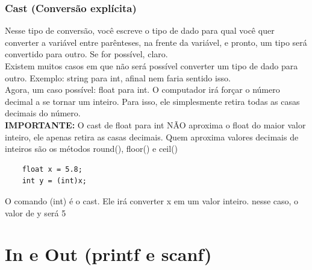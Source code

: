 \documentclass{article}
\begin{document}
\subsubsection{Cast (Conversão explícita)}
Nesse tipo de conversão, você escreve o tipo de dado para qual você quer converter a variável entre parênteses, na frente da variável, e pronto, um tipo será convertido para outro. Se for possível, claro.
\\[3pt]
Existem muitos casos em que não será possível converter um tipo de dado para outro. Exemplo: string para int, afinal nem faria sentido isso.
\\[3pt]
Agora, um caso possível: float para int. O computador irá forçar o número decimal a se tornar um inteiro. Para isso, ele simplesmente retira todas as casas decimais do número. 
\\[3pt]
\textbf{IMPORTANTE:} O cast de float para int NÃO aproxima o float do maior valor inteiro, ele apenas retira as casas decimais. Quem aproxima valores decimais de inteiros são os métodos round(), floor() e ceil() 
\begin{lstlisting}
    float x = 5.8;
    int y = (int)x;
\end{lstlisting}
O comando (int) é o cast. Ele irá converter x em um valor inteiro. nesse caso, o valor de y será 5

\section{In e Out (printf e scanf)}
\end{document}

